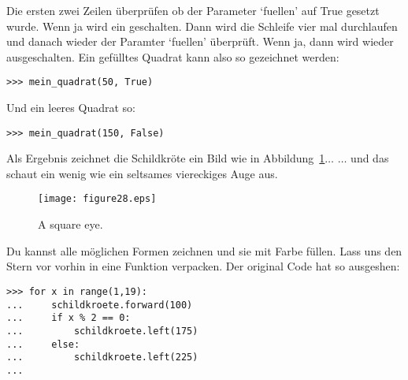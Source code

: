 Die ersten zwei Zeilen überprüfen ob der Parameter `fuellen' auf True gesetzt wurde. Wenn ja wird  ein geschalten. Dann wird die Schleife vier mal durchlaufen und danach wieder der Paramter `fuellen' überprüft. Wenn ja, dann wird  wieder ausgeschalten. Ein gefülltes Quadrat kann also so gezeichnet werden:

\begin{Verbatim}[frame=single]
>>> mein_quadrat(50, True)
\end{Verbatim}

\noindent
Und ein leeres Quadrat so:

\begin{Verbatim}[frame=single]
>>> mein_quadrat(150, False)
\end{Verbatim}

\noindent
Als Ergebnis zeichnet die Schildkröte ein Bild wie in Abbildung~\ref{fig28}$\ldots$ $\ldots$ und das schaut ein wenig wie ein seltsames viereckiges Auge aus.

\begin{figure}
\begin{center}
\texttt{[image: figure28.eps]}
\end{center}
\caption{A square eye.}\label{fig28}
\end{figure}

Du kannst alle möglichen Formen zeichnen und sie mit Farbe füllen. Lass uns den Stern vor vorhin in eine Funktion verpacken. Der original Code hat so ausgeshen:

\begin{Verbatim}[frame=single]
>>> for x in range(1,19):
...     schildkroete.forward(100)
...     if x % 2 == 0:
...         schildkroete.left(175)
...     else:
...         schildkroete.left(225)
...
\end{Verbatim}

